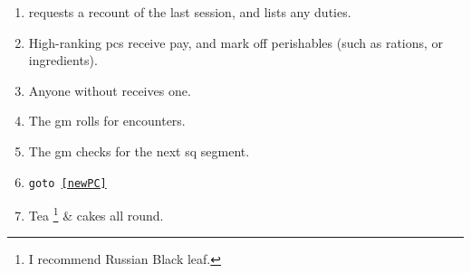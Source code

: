 
\begin{enumerate}
  \item
   requests a recount of the last session, and lists any duties.
  \item
  High-ranking \Glspl{pc} receive pay, and mark off perishables (such as rations, or \glspl{ingredient}).
  \item
  Anyone without  receives one.
  \label{newPC}
  \item
  The \gls{gm} rolls for encounters.
  \item
  The \gls{gm} checks for the next \gls{sq} \gls{segment}.
  \item
  {\tt goto \ref{newPC}}
  \item
  Tea%
  \footnote{I recommend Russian Black leaf.}
  \& cakes all round.
\end{enumerate}
